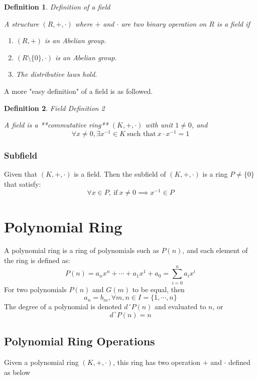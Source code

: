 \documentclass{book}
\newtheorem{Definition}{Definition}[section]
\numberwithin{identity}{subsection}
\numberwithin{Rule}{subsection}
\numberwithin{Theorem}{subsection}
\numberwithin{Definition}{subsection}
\begin{document}
\begin{Definition}
    Definition of a field 
    
    A structure $(R,+,\cdot)$ where $+$ and $\cdot$ are two binary operation on $R$ is a field if

    \begin{enumerate}
        \item $(R,+)$ is an Abelian group. 
\item $(R\setminus \{0\},\cdot)$ is an Abelian group. 
\item The distributive laws hold. 
    \end{enumerate}
\end{Definition}

A more "easy definition" of a field is as followed. 

\begin{Definition}
    Field Definition 2

    A field is a **commutative ring** $(K, +,\cdot)$ with unit $1 \neq 0$, and $$\forall x \neq 0, \exists x^{-1}\in K\: \text{such that}\: x\cdot x^{-1}=1$$
\end{Definition}

\subsubsection{Subfield} 
Given that $(K,+,\cdot)$ is a field. Then the subfield of $(K,+,\cdot)$ is a ring $P\neq \{0\}$ that satisfy: $$\forall x \in P,\: \text{if}\: x \neq 0 \implies x^{-1}\in P$$

\section{Polynomial Ring}

A polynomial ring is a ring of polynomials such as $P(n)$, and each element of the ring is defined as: 
$$P(n)=a_{n}x^{n}+\cdots + a_{1}x^{1}+a_{0}=\sum\limits_{i=0}^{n}a_{i}x^{i}$$
For two polynomials $P(n)$ and $G(m)$ to be equal, then $$a_{n}=b_{m},\forall m,n \in I = \{1,\cdots,n\}$$
The degree of a polynomial is denoted $d^{\:\circ} P(n)$ and evaluated to $n$, or $$d^{\:\circ} P(n)=n$$


\subsection{Polynomial Ring Operations}

Given a polynomial ring $(K,+,\cdot)$, this ring has two operation $+$ and $\cdot$ defined as below
\end{document}
